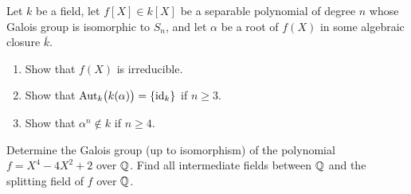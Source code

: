 \begin{problem}
  Let \(k\) be a field, let \(f[X]\in k[X]\) be a separable polynomial of
  degree \(n\) whose Galois group is isomorphic to \(S_n\), and let
  \(\alpha\) be a root of \(f(X)\) in some algebraic closure \(\bar k\).
  \begin{enumerate}[label=(\alph*),noitemsep]
  \item Show that \(f(X)\) is irreducible.
  \item Show that \(\operatorname{Aut}_k\bigl( k(\alpha) \bigr)=\{\operatorname{id}_k\}\) if \(n\geq
    3\).
  \item Show that \(\alpha^n\notin k\) if \(n\geq 4\).
  \end{enumerate}
\end{problem}
\begin{solution}
\end{solution}

\begin{problem}
  Determine the Galois group (up to isomorphism) of the polynomial
  \(f=X^4-4X^2+2\) over \(\mathbb{Q}\). Find all intermediate fields between
  \(\mathbb{Q}\) and the splitting field of \(f\) over \(\mathbb{Q}\).
\end{problem}
\begin{solution}
\end{solution}

